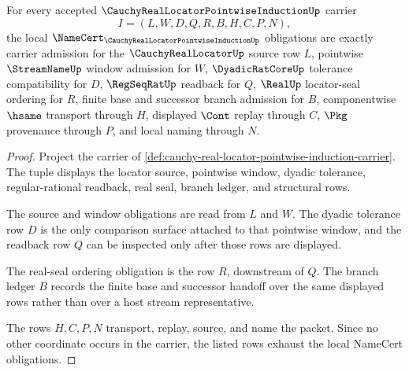 \begin{theorem}
\label{thm:cauchy-real-locator-pointwise-induction-namecert-obligations}
For every accepted $\CauchyRealLocatorPointwiseInductionUp$ carrier
$$
I=(L,W,D,Q,R,B,H,C,P,N),
$$
the local $\NameCert_{\CauchyRealLocatorPointwiseInductionUp}$ obligations are exactly carrier admission for the $\CauchyRealLocatorUp$ source row $L$, pointwise $\StreamNameUp$ window admission for $W$, $\DyadicRatCoreUp$ tolerance compatibility for $D$, $\RegSeqRatUp$ readback for $Q$, $\RealUp$ locator-seal ordering for $R$, finite base and successor branch admission for $B$, componentwise $\hsame$ transport through $H$, displayed $\Cont$ replay through $C$, $\Pkg$ provenance through $P$, and local naming through $N$.
\end{theorem}
\begin{proof}
Project the carrier of \autoref{def:cauchy-real-locator-pointwise-induction-carrier}. The tuple displays the locator source, pointwise window, dyadic tolerance, regular-rational readback, real seal, branch ledger, and structural rows.

The source and window obligations are read from $L$ and $W$. The dyadic tolerance row $D$ is the only comparison surface attached to that pointwise window, and the readback row $Q$ can be inspected only after those rows are displayed.

The real-seal ordering obligation is the row $R$, downstream of $Q$. The branch ledger $B$ records the finite base and successor handoff over the same displayed rows rather than over a host stream representative.

The rows $H,C,P,N$ transport, replay, source, and name the packet. Since no other coordinate occurs in the carrier, the listed rows exhaust the local NameCert obligations.
\end{proof}

